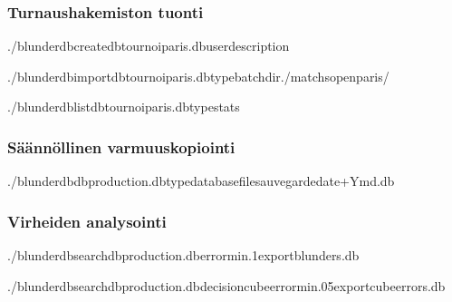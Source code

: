 \documentclass[letterpaper,10pt,finnish]{sphinxmanual}
\begin{document}
\subsubsection{Turnaushakemiston tuonti}
\label{\detokenize{cli:import-d-un-repertoire-de-tournoi}}
\begin{sphinxVerbatim}[commandchars=\\\{\}]
./blunderdbcreate\PYGZhy{}\PYGZhy{}dbtournoi\PYGZus{}paris.db\PYGZhy{}\PYGZhy{}user\PYGZhy{}\PYGZhy{}description

./blunderdbimport\PYGZhy{}\PYGZhy{}dbtournoi\PYGZus{}paris.db\PYGZhy{}\PYGZhy{}typebatch\PYGZhy{}\PYGZhy{}dir./matchs\PYGZus{}open\PYGZus{}paris/

./blunderdblist\PYGZhy{}\PYGZhy{}dbtournoi\PYGZus{}paris.db\PYGZhy{}\PYGZhy{}typestats
\end{sphinxVerbatim}


\subsubsection{Säännöllinen varmuuskopiointi}
\label{\detokenize{cli:sauvegarde-reguliere}}
\begin{sphinxVerbatim}[commandchars=\\\{\}]
./blunderdb\PYGZhy{}\PYGZhy{}dbproduction.db\PYGZhy{}\PYGZhy{}typedatabase\PYGZhy{}\PYGZhy{}filesauvegarde\PYGZhy{}date+\PYGZpc{}Y\PYGZpc{}m\PYGZpc{}d.db
\end{sphinxVerbatim}


\subsubsection{Virheiden analysointi}
\label{\detokenize{cli:analyse-des-erreurs}}
\begin{sphinxVerbatim}[commandchars=\\\{\}]
./blunderdbsearch\PYGZhy{}\PYGZhy{}dbproduction.db\PYGZhy{}\PYGZhy{}error\PYGZhy{}min.1\PYGZhy{}\PYGZhy{}exportblunders.db

./blunderdbsearch\PYGZhy{}\PYGZhy{}dbproduction.db\PYGZhy{}\PYGZhy{}decisioncube\PYGZhy{}\PYGZhy{}error\PYGZhy{}min.05\PYGZhy{}\PYGZhy{}exportcube\PYGZus{}errors.db
\end{sphinxVerbatim}
\end{document}
